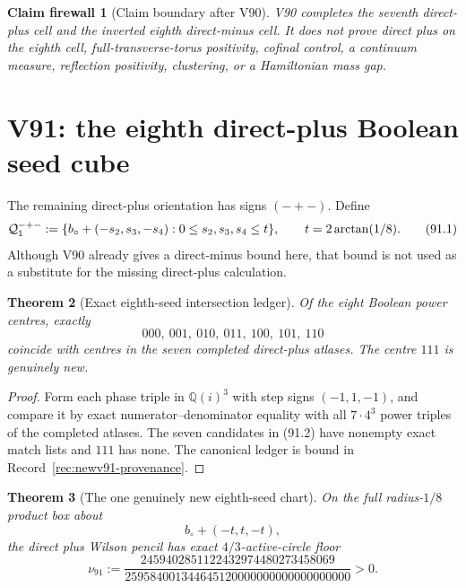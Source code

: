 \documentclass[11pt,oneside]{article}
\newtheorem{theorem}{Theorem}[section]
\newtheorem{firewall}[theorem]{Claim firewall}
\theoremstyle{definition}
\theoremstyle{remark}
\begin{document}
\begin{firewall}[Claim boundary after V90]
\label{fire:newv90-final}
V90 completes the seventh direct-plus cell and the inverted eighth
direct-minus cell.  It does not prove direct plus on the eighth cell,
full-transverse-torus positivity, cofinal control, a continuum
measure, reflection positivity, clustering, or a Hamiltonian mass
gap.
\end{firewall}

\section{V91: the eighth direct-plus Boolean seed cube}
\label{sec:newv91-eighth-seed}

The remaining direct-plus orientation has signs \((-+-)\).  Define
\[
 {\cal Q}^{-+-}_1:=
 \{b_\circ+(-s_2,s_3,-s_4):0\leq s_2,s_3,s_4\leq t\},
 \qquad t=2\arctan(1/8).                              \tag{91.1}
\]
Although V90 already gives a direct-minus bound here, that bound is
not used as a substitute for the missing direct-plus calculation.

\begin{theorem}[Exact eighth-seed intersection ledger]
\label{thm:newv91-intersection}
Of the eight Boolean power centres, exactly
\[
 000,\ 001,\ 010,\ 011,\ 100,\ 101,\ 110             \tag{91.2}
\]
coincide with centres in the seven completed direct-plus atlases.
The centre \(111\) is genuinely new.
\end{theorem}

\begin{proof}
Form each phase triple in \(\mathbb Q(i)^3\) with step signs
\((-1,1,-1)\), and compare it by exact numerator--denominator
equality with all \(7\cdot4^3\) power triples of the completed
atlases.  The seven candidates in (91.2) have nonempty exact match
lists and \(111\) has none.  The canonical ledger is bound in
Record~\ref{rec:newv91-provenance}.
\end{proof}

\begin{theorem}[The one genuinely new eighth-seed chart]
\label{thm:newv91-new-chart}
On the full radius-\(1/8\) product box about
\[
 b_\circ+(-t,t,-t),                                   \tag{91.3}
\]
the direct plus Wilson pencil has exact \(4/3\)-active-circle floor
\[
\nu_{91}:=
\frac{2459402851122432974480273458069}
     {259584001344645120000000000000000000}>0.        \tag{91.4}
\]
\end{theorem}
\end{document}
